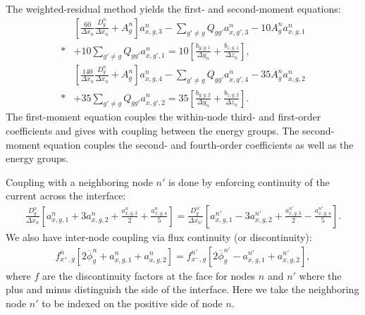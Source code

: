 The weighted-residual method yields the first- and second-moment equations:
\begin{align}
  &\left[ \frac{60 }{ \Delta x_n } \frac{ D_g^n }{ \Delta x_n } + A_g^n \right] a_{x,g,3}^n -  \sum_{g' \ne g} Q_{gg'} a_{x,g',3}^n - 10 A_g^n a_{x,g,1}^n \nonumber \\*
  &+ 10 \sum_{g' \ne g} Q_{gg'} a_{x,g',1}^n = 10 \left[ \frac{b_{y,g,1}}{\Delta y_n} + \frac{b_{z,g,1}}{\Delta z_n} \right] , \label{Eq:diffusion_nodalFirstMoment_coefficients} \\
 &\left[  \frac{140}{ \Delta x_n } \frac{ D_g^n }{ \Delta x_n } + A_g^n \right] a_{x,g,4}^n -  \sum_{g' \ne g} Q_{gg'} a_{x,g',4}^n - 35 A_g^n a_{x,g,2}^n \nonumber \\*
  &+ 35 \sum_{g' \ne g} Q_{gg'} a_{x,g',2}^n = 35 \left[ \frac{b_{y,g,2}}{\Delta y_n} + \frac{b_{z,g,2}}{\Delta z_n} \right] . \label{Eq:diffusion_nodalSecondMoment_coefficients}
\end{align}
The first-moment equation couples the within-node third- and first-order coefficients and gives with coupling between the energy groups. The second-moment equation couples the second- and fourth-order coefficients as well as the energy groups.

Coupling with a neighboring node $n'$ is done by enforcing continuity of the current across the interface:
\begin{align}
    \frac{ D_g^n }{ \Delta x_n } \left[ a_{x,g,1}^n + 3 a_{x,g,2}^n + \frac{a_{x,g,3}^n}{2} + \frac{a_{x,g,4}^n}{5} \right]
  = \frac{ D_g^{n'} }{ \Delta x_{n'} } \left[ a_{x,g,1}^{n'} - 3 a_{x,g,2}^{n'} + \frac{a_{x,g,3}^{n'}}{2} - \frac{a_{x,g,4}^{n'}}{5} \right] . \label{Eq:diffusion_nodalCurrentContinuity_coefficients}
\end{align}
We also have inter-node coupling via flux continuity (or discontinuity):
\begin{align}
   f_{x^+,g}^n \left[ 2 \overline{\phi}_g^n + a_{x,g,1}^n + a_{x,g,2}^n \right] = f_{x^-,g}^{n'} \left[ 2 \overline{\phi}_g^{n'} - a_{x,g,1}^{n'} + a_{x,g,2}^{n'} \right] , \label{Eq:diffusion_nodalFluxDiscontinity_coefficients}
\end{align}
where $f$ are the discontinuity factors at the face for nodes $n$ and $n'$ where the plus and minus distinguish the side of the interface. Here we take the neighboring node $n'$ to be indexed on the positive side of node $n$.



